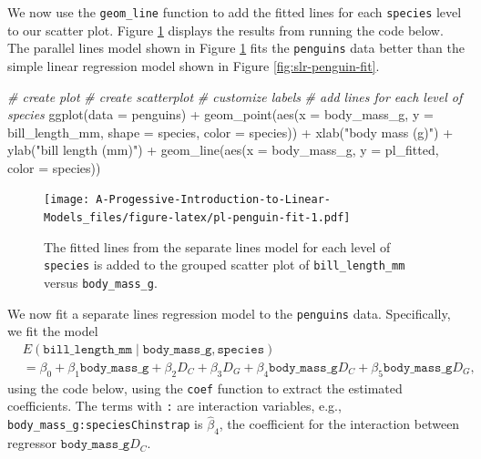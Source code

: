 \documentclass[
]{book}
\newenvironment{Shaded}{\begin{snugshade}}{\end{snugshade}}
\newcommand{\AttributeTok}[1]{\textcolor[rgb]{0.77,0.63,0.00}{#1}}
\newcommand{\CommentTok}[1]{\textcolor[rgb]{0.56,0.35,0.01}{\textit{#1}}}
\newcommand{\FunctionTok}[1]{\textcolor[rgb]{0.00,0.00,0.00}{#1}}
\newcommand{\NormalTok}[1]{#1}
\newcommand{\SpecialCharTok}[1]{\textcolor[rgb]{0.00,0.00,0.00}{#1}}
\newcommand{\StringTok}[1]{\textcolor[rgb]{0.31,0.60,0.02}{#1}}
\theoremstyle{definition}
\theoremstyle{definition}
\theoremstyle{definition}
\theoremstyle{definition}
\theoremstyle{remark}
\begin{document}
We now use the \texttt{geom\_line} function to add the fitted lines for each \texttt{species} level to our scatter plot. Figure \ref{fig:pl-penguin-fit} displays the results from running the code below. The parallel lines model shown in Figure \ref{fig:pl-penguin-fit} fits the \texttt{penguins} data better than the simple linear regression model shown in Figure \ref{fig:slr-penguin-fit}.

\begin{Shaded}
\begin{Highlighting}[]
\CommentTok{\# create plot}
\CommentTok{\# create scatterplot}
\CommentTok{\# customize labels}
\CommentTok{\# add lines for each level of species}
\FunctionTok{ggplot}\NormalTok{(}\AttributeTok{data =}\NormalTok{ penguins) }\SpecialCharTok{+}
  \FunctionTok{geom\_point}\NormalTok{(}\FunctionTok{aes}\NormalTok{(}\AttributeTok{x =}\NormalTok{ body\_mass\_g, }\AttributeTok{y =}\NormalTok{ bill\_length\_mm,}
                 \AttributeTok{shape =}\NormalTok{ species, }\AttributeTok{color =}\NormalTok{ species)) }\SpecialCharTok{+}
  \FunctionTok{xlab}\NormalTok{(}\StringTok{"body mass (g)"}\NormalTok{) }\SpecialCharTok{+} \FunctionTok{ylab}\NormalTok{(}\StringTok{"bill length (mm)"}\NormalTok{) }\SpecialCharTok{+}
  \FunctionTok{geom\_line}\NormalTok{(}\FunctionTok{aes}\NormalTok{(}\AttributeTok{x =}\NormalTok{ body\_mass\_g, }\AttributeTok{y =}\NormalTok{ pl\_fitted, }\AttributeTok{color =}\NormalTok{ species))}
\end{Highlighting}
\end{Shaded}

\begin{figure}
\centering
\texttt{[image: A-Progessive-Introduction-to-Linear-Models\_files/figure-latex/pl-penguin-fit-1.pdf]}
\caption{\label{fig:pl-penguin-fit}The fitted lines from the separate lines model for each level of \texttt{species} is added to the grouped scatter plot of \texttt{bill\_length\_mm} versus \texttt{body\_mass\_g}.}
\end{figure}

We now fit a separate lines regression model to the \texttt{penguins} data. Specifically, we fit the model
\[
\begin{aligned}
&E(\mathtt{bill\_length\_mm} \mid \mathtt{body\_mass\_g}, \mathtt{species}) \\
&= \beta_{0} + \beta_1 \mathtt{body\_mass\_g} + \beta_2 D_C + \beta_3 D_G + \beta_4 \mathtt{body\_mass\_g} D_C + \beta_5 \mathtt{body\_mass\_g} D_G ,
\end{aligned}
\]
using the code below, using the \texttt{coef} function to extract the estimated coefficients. The terms with \texttt{:} are interaction variables, e.g., \texttt{body\_mass\_g:speciesChinstrap} is \(\hat{\beta}_4\), the coefficient for the interaction between regressor \(\mathtt{body\_mass\_g} D_C\).
\end{document}
